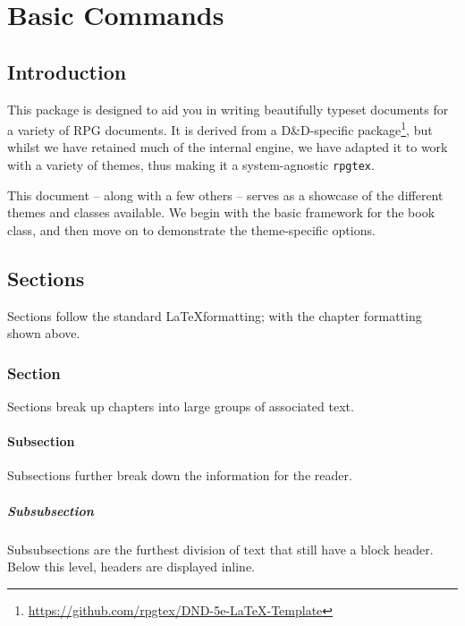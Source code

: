 
\frontmatter
\maketitle
\tableofcontents


\mainmatter
  \if{}
	\RpgSetThemeColor[red]{}
  \fi

\part{Basic Commands}

	\chapter{Introduction}


	 This package is designed to aid you in writing beautifully typeset documents for a variety of RPG documents. It is derived from {a D\&D-specific package}\footnote{\url{https://github.com/rpgtex/DND-5e-LaTeX-Template}}, but whilst we have retained much of the internal engine, we have adapted it to work with a variety of themes, thus making it a system-agnostic \verb|rpgtex|.

	This document -- along with a few others -- serves as a showcase of the different themes and classes available. We begin with the basic framework for the book class, and then move on to demonstrate the theme-specific options.

	\chapter{Sections}
		Sections follow the standard \LaTeX formatting; with the chapter formatting shown above.
		\section{Section}
			Sections break up chapters into large groups of associated text.

			\subsection{Subsection}
				Subsections further break down the information for the reader.

				\subsubsection{Subsubsection}
					Subsubsections are the furthest division of text that still have a block header. Below this level, headers are displayed inline.

